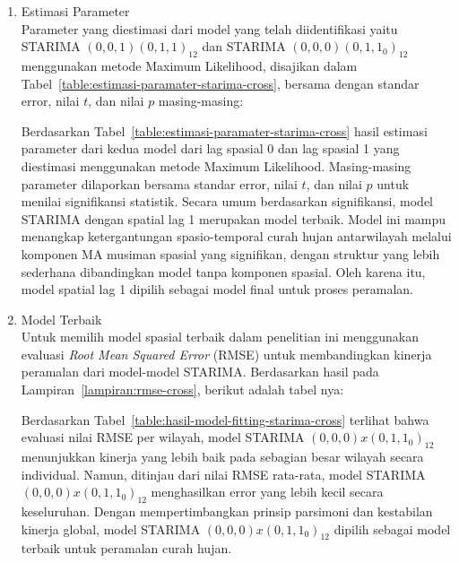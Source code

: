 \begin{enumerate}[label=\Alph*.]
    \item Estimasi Parameter \\
    Parameter yang diestimasi dari model yang telah diidentifikasi yaitu STARIMA $(0,0,1)(0,1,1)_{12}$ dan STARIMA $(0,0,0)(0,1,1_{0})_{12}$ menggunakan metode Maximum Likelihood, disajikan dalam Tabel~\ref{table:estimasi-paramater-starima-cross}, bersama dengan standar error, nilai $t$, dan nilai $p$ masing-masing:
    
    Berdasarkan Tabel~\ref{table:estimasi-paramater-starima-cross} hasil estimasi parameter dari kedua model dari lag spasial 0 dan lag spasial 1 yang diestimasi menggunakan metode Maximum Likelihood.
    Masing-masing parameter dilaporkan bersama standar error, nilai $t$, dan nilai $p$ untuk menilai signifikansi statistik.
    Secara umum berdasarkan signifikansi, model STARIMA dengan spatial lag 1 merupakan model terbaik.
    Model ini mampu menangkap ketergantungan spasio-temporal curah hujan antarwilayah melalui komponen MA musiman spasial yang signifikan, dengan struktur yang lebih sederhana dibandingkan model tanpa komponen spasial.
    Oleh karena itu, model spatial lag 1 dipilih sebagai model final untuk proses peramalan.

    \item Model Terbaik \\
    Untuk memilih model spasial terbaik dalam penelitian ini menggunakan evaluasi \textit{Root Mean Squared Error} (RMSE) untuk membandingkan kinerja peramalan dari model-model STARIMA.
    Berdasarkan hasil pada Lampiran~\ref{lampiran:rmse-cross},  berikut adalah tabel nya:
    
    Berdasarkan Tabel~\ref{table:hasil-model-fitting-starima-cross} terlihat bahwa evaluasi nilai RMSE per wilayah, model STARIMA $(0,0,0) x (0,1,1_{0})_{12}$ menunjukkan kinerja yang lebih baik pada sebagian besar wilayah secara individual.
    Namun, ditinjau dari nilai RMSE rata-rata, model STARIMA $(0,0,0) x (0,1,1_{0})_{12}$ menghasilkan error yang lebih kecil secara keseluruhan.
    Dengan mempertimbangkan prinsip parsimoni dan kestabilan kinerja global, model STARIMA $(0,0,0) x (0,1,1_{0})_{12}$ dipilih sebagai model terbaik untuk peramalan curah hujan.


\end{enumerate}
